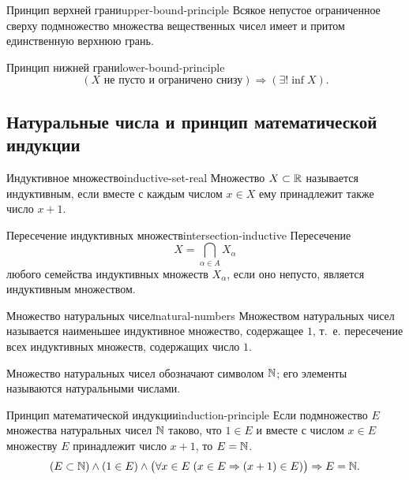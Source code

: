 \begin{lemma}{Принцип верхней грани}{upper-bound-principle}
  Всякое непустое ограниченное сверху подмножество множества вещественных
  чисел имеет и притом единственную верхнюю грань.
\end{lemma}

\begin{lemma}{Принцип нижней грани}{lower-bound-principle}
  \[
    (X\text{ не пусто и ограничено снизу})\Rightarrow(\exists!\inf X).
  \]
\end{lemma}


\subsection{Натуральные числа и принцип математической индукции}

\begin{definition}{Индуктивное множество}{inductive-set-real}
  Множество $X\subset\mathbb{R}$ называется индуктивным, если вместе с каждым
  числом $x\in X$ ему принадлежит также число $x+1$.
\end{definition}

\begin{properties}{Пересечение индуктивных множеств}{intersection-inductive}
  Пересечение
  \[
    X=\bigcap_{\alpha\in A}X_{\alpha}
  \]
  любого семейства индуктивных множеств $X_{\alpha}$, если оно непусто,
  является индуктивным множеством.
\end{properties}

\begin{definition}{Множество натуральных чисел}{natural-numbers}
  Множеством натуральных чисел называется наименьшее индуктивное множество,
  содержащее $1$, т.~е. пересечение всех индуктивных множеств, содержащих
  число $1$.

  Множество натуральных чисел обозначают символом $\mathbb{N}$; его элементы
  называются натуральными числами.
\end{definition}

\begin{properties}{Принцип математической индукции}{induction-principle}
  Если подмножество $E$ множества натуральных чисел $\mathbb{N}$ таково, что $1\in E$
  и вместе с числом $x\in E$ множеству $E$ принадлежит число $x+1$, то
  $E=\mathbb{N}$.
  \[
    (E\subset\mathbb{N})\land(1\in E)\land
    \bigl(\forall x\in E\;(x\in E\Rightarrow(x+1)\in E)\bigr)
    \Rightarrow E=\mathbb{N}.
  \]
\end{properties}

